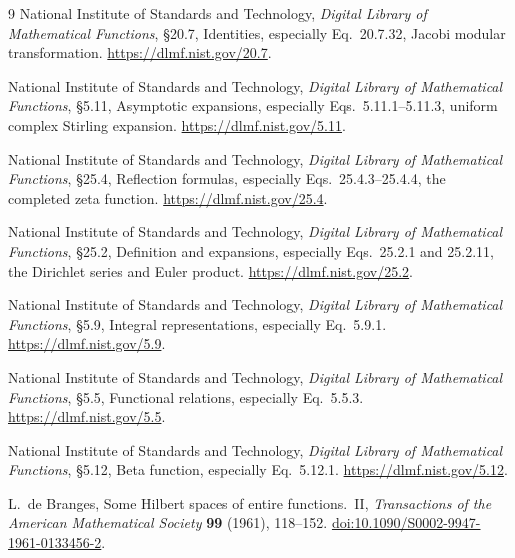 \documentclass[11pt,a4paper]{article}
\numberwithin{equation}{section}
\theoremstyle{definition}
\theoremstyle{remark}
\begin{document}
\begin{thebibliography}{9}
National Institute of Standards and Technology,
\emph{Digital Library of Mathematical Functions}, \S20.7, Identities,
especially Eq.~20.7.32, Jacobi modular transformation.
\url{https://dlmf.nist.gov/20.7}.

National Institute of Standards and Technology,
\emph{Digital Library of Mathematical Functions}, \S5.11, Asymptotic expansions,
especially Eqs.~5.11.1--5.11.3, uniform complex Stirling expansion.
\url{https://dlmf.nist.gov/5.11}.

National Institute of Standards and Technology,
\emph{Digital Library of Mathematical Functions}, \S25.4, Reflection formulas,
especially Eqs.~25.4.3--25.4.4, the completed zeta function.
\url{https://dlmf.nist.gov/25.4}.

National Institute of Standards and Technology,
\emph{Digital Library of Mathematical Functions}, \S25.2, Definition and expansions,
especially Eqs.~25.2.1 and 25.2.11, the Dirichlet series and Euler product.
\url{https://dlmf.nist.gov/25.2}.

National Institute of Standards and Technology,
\emph{Digital Library of Mathematical Functions}, \S5.9,
Integral representations, especially Eq.~5.9.1.
\url{https://dlmf.nist.gov/5.9}.

National Institute of Standards and Technology,
\emph{Digital Library of Mathematical Functions}, \S5.5,
Functional relations, especially Eq.~5.5.3.
\url{https://dlmf.nist.gov/5.5}.

National Institute of Standards and Technology,
\emph{Digital Library of Mathematical Functions}, \S5.12,
Beta function, especially Eq.~5.12.1.
\url{https://dlmf.nist.gov/5.12}.

L.~de Branges,
Some Hilbert spaces of entire functions.~II,
\emph{Transactions of the American Mathematical Society} \textbf{99} (1961), 118--152.
\href{https://doi.org/10.1090/S0002-9947-1961-0133456-2}{doi:10.1090/S0002-9947-1961-0133456-2}.
\end{thebibliography}
\end{document}
